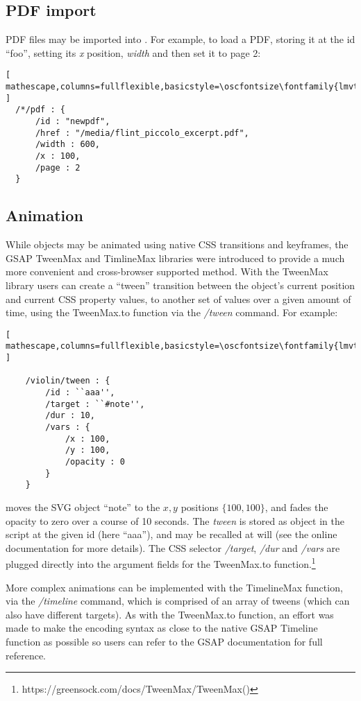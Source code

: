 \subsection{PDF import}\label{sec:pdf}
PDF files may be imported into \drawsocket.
For example, to load a PDF, storing it at the \drawsocket id ``foo'', setting its \textit{x} position, \textit{width} and then set it to page 2:

\begin{lstlisting}[ mathescape,columns=fullflexible,basicstyle=\oscfontsize\fontfamily{lmvtt}\selectfont ]
  /*/pdf : {
      /id : "newpdf",
      /href : "/media/flint_piccolo_excerpt.pdf",
      /width : 600,
      /x : 100,
      /page : 2
  }
 \end{lstlisting}


\subsection{Animation}\label{sec:animation}
While \drawsocket objects may be animated using native CSS transitions and keyframes, the GSAP TweenMax and TimlineMax libraries were introduced to provide a much more convenient and cross-browser supported method.
With the TweenMax library users can create a ``tween'' transition between the object's current position and current CSS property values, to another set of values over a given amount of time, using the TweenMax.to function via the \textit{/tween} \drawsocket command. For example:
\begin{lstlisting}[ mathescape,columns=fullflexible,basicstyle=\oscfontsize\fontfamily{lmvtt}\selectfont ]

    /violin/tween : {
        /id : ``aaa'',
        /target : ``#note'', 
        /dur : 10,
        /vars : {
            /x : 100,
            /y : 100,
            /opacity : 0
        }
    }
 \end{lstlisting}
\noindent
moves the SVG object ``note'' to the ${x,y}$ positions $\{100,100\}$, and fades the opacity to zero over a course of 10 seconds.
The \textit{tween} is stored as object in the \drawsocket script at the given id (here ``aaa''), and may be recalled at will (see the online documentation for more details).
The CSS selector \textit{/target}, \textit{/dur} and \textit{/vars} are plugged directly into the argument fields for the TweenMax.to function.\footnote{https://greensock.com/docs/TweenMax/TweenMax()}

More complex animations can be implemented with the TimelineMax function, via the \drawsocket \textit{/timeline} command, which is comprised of an array of tweens (which can also have different targets).
As with the TweenMax.to function, an effort was made to make the encoding syntax as close to the native GSAP Timeline function as possible so users can refer to the GSAP documentation for full reference.

